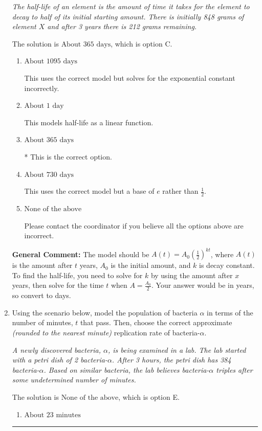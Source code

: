 \documentclass{extbook}[14pt]
\newcommand{\litem}[1]{\item #1

\rule{\textwidth}{0.4pt}}
\begin{document}
\begin{enumerate}
{\begin{center}
    \textit{ The half-life of an element is the amount of time it takes for the element to decay to half of its initial starting amount. There is initially 848 grams of element $X$ and after 3 years there is 212 grams remaining. }
\end{center}
The solution is \( \text{About } 365 \text{ days} \), which is option C.\begin{enumerate}[label=\Alph*.]
\item \( \text{About } 1095 \text{ days} \)

This uses the correct model but solves for the exponential constant incorrectly.
\item \( \text{About } 1 \text{ day} \)

This models half-life as a linear function.
\item \( \text{About } 365 \text{ days} \)

* This is the correct option.
\item \( \text{About } 730 \text{ days} \)

This uses the correct model but a base of $e$ rather than $\frac{1}{2}$.
\item \( \text{None of the above} \)

Please contact the coordinator if you believe all the options above are incorrect.
\end{enumerate}

\textbf{General Comment:} The model should be $A(t) = A_0 (\frac{1}{2})^{kt}$, where $A(t)$ is the amount after $t$ years, $A_0$ is the initial amount, and $k$ is decay constant. To find the half-life, you need to solve for $k$ by using the amount after $x$ years, then solve for the time $t$ when $A = \frac{A_0}{2}$. Your answer would be in years, so convert to days.
}
\litem{
Using the scenario below, model the population of bacteria $\alpha$ in terms of the number of minutes, $t$ that pass. Then, choose the correct approximate \textit{(rounded to the nearest minute)} replication rate of bacteria-$\alpha$.

\begin{center}
    \textit{ A newly discovered bacteria, $\alpha$, is being examined in a lab. The lab started with a petri dish of 2 bacteria-$\alpha$. After 3 hours, the petri dish has 384 bacteria-$\alpha$. Based on similar bacteria, the lab believes bacteria-$\alpha$ triples after some undetermined number of minutes. }
\end{center}
The solution is \( \text{None of the above} \), which is option E.\begin{enumerate}[label=\Alph*.]
\item \( \text{About } 23 \text{ minutes} \)


\end{enumerate}}
\end{enumerate}
\end{document}
